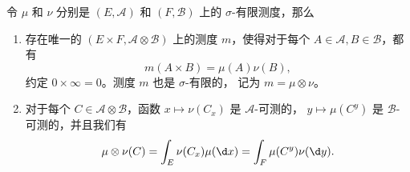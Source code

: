 \documentclass[fontset=none]{Notes}
\begin{document}
\begin{theorem}\label{thm:product measure}
  令 $\mu$ 和 $\nu$ 分别是 $(E,\mathcal{A})$ 和 $(F,\mathcal{B})$
  上的 $\sigma$-有限测度，那么
  \begin{enumerate}
    \item 存在唯一的 $(E\times F,\mathcal{A}\otimes \mathcal{B})$
    上的测度 $m$，使得对于每个 $A\in \mathcal{A},B\in \mathcal{B}$，都有
    \[
      m(A\times B)=\mu(A)\nu(B),  
    \]
    约定 $0\times \infty=0$。测度 $m$ 也是 $\sigma$-有限的，
    记为 $m=\mu\otimes\nu$。
    \item 对于每个 $C\in \mathcal{A}\otimes \mathcal{B}$，函数
    $x\mapsto \nu(C_x)$ 是 $\mathcal{A}$-可测的，
    $y\mapsto \mu(C^y)$ 是 $\mathcal{B}$-可测的，并且我们有
    \[
      \mu\otimes \nu(C)=\int_E \nu(C_x)\mu(\d x)=\int_F\mu(C^y)\nu(\d y).  
    \]
  \end{enumerate}
\end{theorem}
\end{document}
